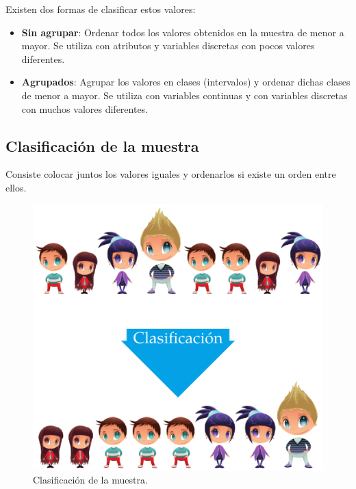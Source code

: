 \documentclass[
  a4paper,
]{scrreport}
\theoremstyle{plain}
\theoremstyle{definition}
\theoremstyle{definition}
\theoremstyle{remark}
\begin{document}
Existen dos formas de clasificar estos valores:

\begin{itemize}
\item
  \textbf{Sin agrupar}: Ordenar todos los valores obtenidos en la
  muestra de menor a mayor. Se utiliza con atributos y variables
  discretas con pocos valores diferentes.
\item
  \textbf{Agrupados}: Agrupar los valores en clases (intervalos) y
  ordenar dichas clases de menor a mayor. Se utiliza con variables
  continuas y con variables discretas con muchos valores diferentes.
\end{itemize}

\hypertarget{clasificaciuxf3n-de-la-muestra}{%
\subsection{Clasificación de la
muestra}\label{clasificaciuxf3n-de-la-muestra}}

Consiste colocar juntos los valores iguales y ordenarlos si existe un
orden entre ellos.

\begin{figure}

{\centering \includegraphics{img/descriptiva/clasificacion_muestra.png}

}

\caption{Clasificación de la muestra.}

\end{figure}
\end{document}
